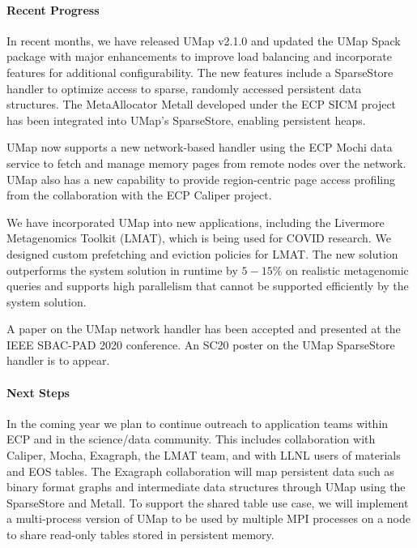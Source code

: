 \paragraph{Recent Progress}

In recent months, we have released UMap v2.1.0 and updated the UMap Spack package with major enhancements to improve load balancing and incorporate features for additional configurability. The new features include a SparseStore handler to optimize access to sparse, randomly accessed persistent data structures. The MetaAllocator Metall developed under the ECP SICM project has been integrated into UMap's SparseStore, enabling persistent heaps. 

UMap now supports a new network-based handler using the ECP Mochi data service to fetch and manage memory pages from remote nodes over the network. UMap also has a new capability to provide region-centric page access profiling from the collaboration with the ECP Caliper project. 

We have incorporated UMap into new applications, including the Livermore Metagenomics Toolkit (LMAT), which is being used for COVID research. We designed custom prefetching and eviction policies for LMAT.  The new solution outperforms the system solution in runtime by $5-15\%$ on realistic metagenomic queries and supports high parallelism that cannot be supported efficiently by the system solution. 

A paper on the UMap network handler has been accepted and presented at the IEEE SBAC-PAD 2020 conference. An SC20 poster on the UMap SparseStore handler is to appear.

\paragraph{Next Steps}
In the coming year we plan to continue outreach to application teams
within ECP and in the science/data community. This includes
collaboration with Caliper, Mocha, Exagraph, the LMAT team, and
with LLNL users of materials and EOS tables. The Exagraph
collaboration will map persistent data such as binary format graphs
and intermediate data structures through UMap using the SparseStore
and Metall. To support the shared table use 
case, we will implement a multi-process version of UMap to be used by
multiple MPI processes on a node to share read-only tables stored in
persistent memory.

